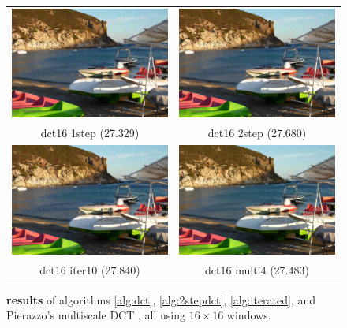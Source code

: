 \documentclass{ipol}
\begin{document}
\begin{figure}[htbp]
\begin{center}
\begin{tabular}{cc}

\includegraphics[width = .44\textwidth]{f/dct16_1step} &
\includegraphics[width = .44\textwidth]{f/dct16_2step} \\
dct16 1step (27.329) & dct16 2step (27.680) \\
\includegraphics[width = .44\textwidth]{f/dct16_iter10} &
\includegraphics[width = .44\textwidth]{f/dct16_multi4} \\
dct16 iter10 (27.840) &  dct16 multi4 (27.483)\\


\end{tabular}
\caption{{\bf results} of algorithms \ref{alg:dct}, \ref{alg:2stepdct},  \ref{alg:iterated}, and Pierazzo's multiscale DCT \cite{multiscaler2016},  all using  $16 \times 16$ windows.}
\label{fig:res16}
\end{center}
\end{figure}
\end{document}
